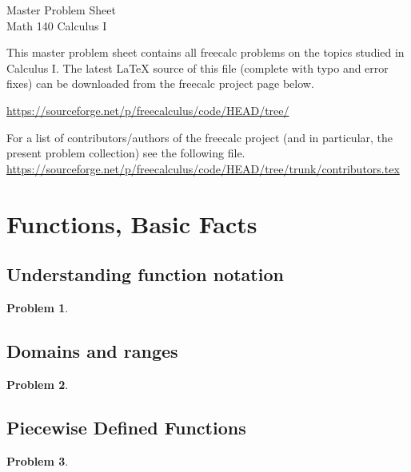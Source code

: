 \documentclass{article}
\newtheorem{problem}{Problem}
\begin{document}
\begin{center}
\Large
Master Problem Sheet \\ Math 140 Calculus I \\ 
\end{center}





This master problem sheet contains all freecalc problems on the topics studied in Calculus I. The latest \LaTeX{} source of this file (complete with typo and error fixes) can be downloaded from the freecalc project page below. 

\url{https://sourceforge.net/p/freecalculus/code/HEAD/tree/}

For a list of contributors/authors of the freecalc project (and in particular, the present problem collection) see the following file.
\url{https://sourceforge.net/p/freecalculus/code/HEAD/tree/trunk/contributors.tex}


\fcLicenseContent



\tableofcontents

\section{Functions, Basic Facts}\label{secMPSfunctionBasics}
\subsection{Understanding function notation}
\begin{problem}

\end{problem}
\subsection{Domains and ranges}
\begin{problem}

\end{problem}
\subsection{Piecewise Defined Functions}
\begin{problem}
\item 
\end{problem}
\end{document}
